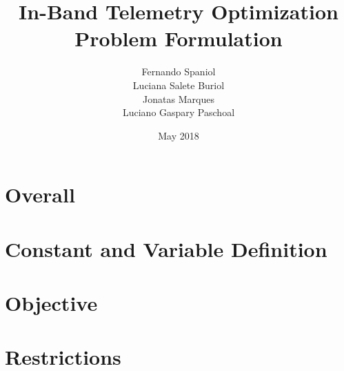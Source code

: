\documentclass{article}
\title{In-Band Telemetry Optimization Problem Formulation}
\author{ Fernando Spaniol \\ Luciana Salete Buriol \\ Jonatas Marques \\ Luciano Gaspary Paschoal}
\date{May 2018}
\begin{document}
\maketitle

\section{Overall}



\section{Constant and Variable Definition}



\section{Objective}



\section{Restrictions}


\end{document}
